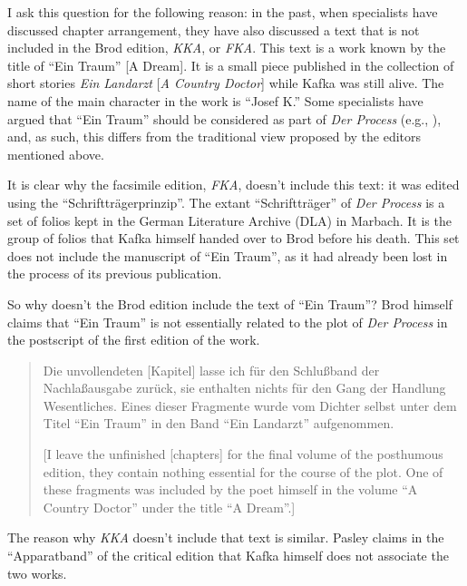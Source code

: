 \documentclass{article}
\begin{document}
I ask this question for the following reason: in the past, when
specialists have discussed chapter arrangement, they have also discussed
a text that is not included in the Brod edition, \emph{KKA}, or
\emph{FKA}. This text is a work known by the title of ``Ein Traum''
{[}A Dream{]}. It is a small piece published in the collection of
short stories \emph{Ein Landarzt} {[}\emph{A Country Doctor}{]} while
Kafka was still alive. The name of the main character in the work is
``Josef K.'' Some specialists have argued that ``Ein Traum'' should be
considered as part of \emph{Der Process} (e.g., \cite{binder_kafka-kommentar_1976}), and, as
such, this differs from the traditional view proposed by the editors
mentioned above.

It is clear why the facsimile edition, \emph{FKA}, doesn't include this
text: it was edited using the ``Schriftträgerprinzip''. The extant
``Schriftträger'' of \emph{Der Process} is a set of folios kept in the
German Literature Archive (DLA) in Marbach. It is the group of folios
that Kafka himself handed over to Brod before his death. This set does
not include the manuscript of ``Ein Traum'', as it had already been lost
in the process of its previous publication.

So why doesn't the Brod edition include the text of ``Ein Traum''? Brod
himself claims that ``Ein Traum'' is not essentially related to the plot
of \emph{Der Process} in the postscript of the first edition of the
work.

\begin{quote}
Die unvollendeten {[}Kapitel{]} lasse ich für den Schlußband der
Nachlaßausgabe zurück, sie enthalten nichts für den Gang der Handlung
Wesentliches. Eines dieser Fragmente wurde vom Dichter selbst unter dem
Titel ``Ein Traum'' in den Band ``Ein Landarzt'' aufgenommen.

\begin{flushright}
    \parencite[323]{kafka_prozess_1946}
\end{flushright}

{[}I leave the unfinished {[}chapters{]} for the final volume of the
posthumous edition, they contain nothing essential for the course of the
plot. One of these fragments was included by the poet himself in the
volume ``A Country Doctor'' under the title ``A Dream''.{]}
\end{quote}

The reason why \emph{KKA} doesn't include that text is similar. Pasley
claims in the ``Apparatband'' of the critical edition that Kafka himself
does not associate the two works.
\end{document}
